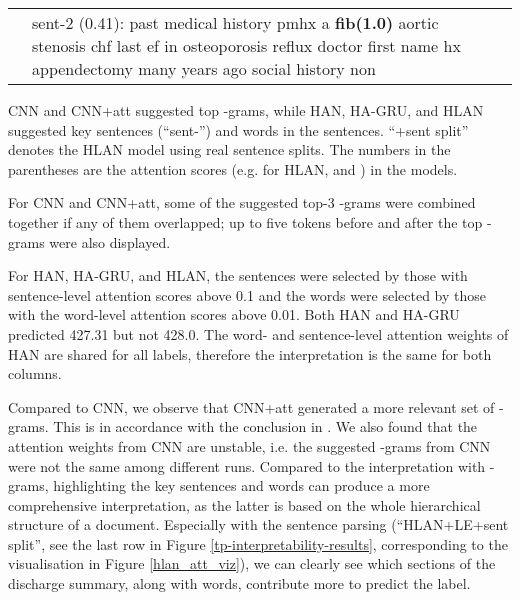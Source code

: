 \documentclass[final,5p,times,twocolumn]{elsarticle}
\begin{document}
\begin{table*}[th]
\begin{threeparttable}
\begin{tabular}{lp{7.5cm}||p{7.5cm}}
\cline{2-2}
                         & sent-2 (0.41): past medical history pmhx a \textbf{fib(1.0)} aortic stenosis chf last ef in osteoporosis reflux doctor first name hx appendectomy many years ago social history non &\\
\cline{1-3}
\end{tabular}
\begin{tablenotes}
\item CNN and CNN+att suggested top -grams, while HAN, HA-GRU, and HLAN suggested key sentences (``sent-'') and words in the sentences. ``+sent split'' denotes the HLAN model using real sentence splits. The numbers in the parentheses are the attention scores (e.g. for HLAN,  and ) in the models.
\item For CNN and CNN+att, some of the suggested top-3 -grams were combined together if any of them overlapped; up to five tokens before and after the top -grams were also displayed.
\item For HAN, HA-GRU, and HLAN, the sentences were selected by those with sentence-level attention scores above 0.1 and the words were selected by those with the word-level attention scores above 0.01. Both HAN and HA-GRU predicted 427.31 but not 428.0. The word- and sentence-level attention weights of HAN are shared for all labels, therefore the interpretation is the same for both columns.
\end{tablenotes}
\end{threeparttable}
\end{table*}

Compared to CNN, we observe that CNN+att generated a more relevant set of -grams. This is in accordance with the conclusion in \cite{mullenbach-etal-2018-explainable}. We also found that the attention weights from CNN are unstable, i.e. the suggested -grams from CNN were not the same among different runs. Compared to the interpretation with -grams, highlighting the key sentences and words can produce a more comprehensive interpretation, as the latter is based on the whole hierarchical structure of a document. Especially with the sentence parsing (``HLAN+LE+sent split'', see the last row in Figure \ref{tp-interpretability-results}, corresponding to the visualisation in Figure \ref{hlan_att_viz}), we can clearly see which sections of the discharge summary, along with words, contribute more to predict the label.
\end{document}

